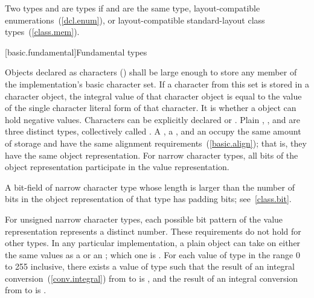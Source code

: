 \pnum
{}%
Two types   and   are
 types
if  and  are the same type,
layout-compatible enumerations~(\ref{dcl.enum}), or
layout-compatible standard-layout class types~(\ref{class.mem}).

[basic.fundamental]{Fundamental types}

\pnum
{}%
%
%
%
%
%
%
Objects declared as characters () shall be large enough to
store any member of the implementation's basic character set. If a
character from this set is stored in a character object, the integral
value of that character object is equal to the value of the single
character literal form of that character. It is 
whether a  object can hold negative values.
%
%
%
Characters can be explicitly declared  or
.
%
Plain , , and  are
three distinct types, collectively called
.
A , a , and an
 occupy the same amount of storage and have the
same alignment requirements~(\ref{basic.align}); that is, they have the
same object representation. For narrow character types, all bits of the object
representation participate in the value representation.
\begin{note}
A bit-field of narrow character type whose length is larger than
the number of bits in the object representation of that type has
padding bits; see~\ref{class.bit}.
\end{note}
For unsigned narrow
character types, each possible bit pattern of the value representation
represents a distinct number. These requirements do not hold for other types. In
any particular implementation, a plain  object can take on
either the same values as a  or an ; which one is .
For each value  of type  in the range
0 to 255 inclusive, there exists a value  of type
 such that the result of an integral
conversion~(\ref{conv.integral}) from  to  is
, and the result of an integral conversion from
 to  is .

